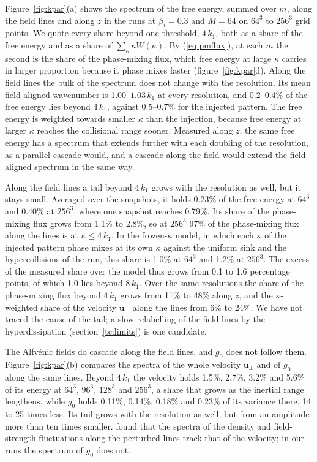 Figure~\ref{fig:kpar}(a) shows the spectrum of the free energy, summed over $m$, along the field lines and along $z$ in the runs at $\beta_i=0.3$ and $M=64$ on $64^3$ to $256^3$ grid points. We quote every share beyond one threshold, $4\,k_1$, both as a share of the free energy and as a share of $\sum_\kappa\kappa W(\kappa)$. By (\ref{eq:pmflux}), at each $m$ the second is the share of the phase-mixing flux, which free energy at large $\kappa$ carries in larger proportion because it phase mixes faster (figure~\ref{fig:kpar}d). Along the field lines the bulk of the spectrum does not change with the resolution. Its mean field-aligned wavenumber is 1.00--$1.03\,k_1$ at every resolution, and 0.2--0.4\% of the free energy lies beyond $4\,k_1$, against 0.5--0.7\% for the injected pattern. The free energy is weighted towards smaller $\kappa$ than the injection, because free energy at larger $\kappa$ reaches the collisional range sooner. Measured along $z$, the same free energy has a spectrum that extends further with each doubling of the resolution, as a parallel cascade would, and a cascade along the field would extend the field-aligned spectrum in the same way.

Along the field lines a tail beyond $4\,k_1$ grows with the resolution as well, but it stays small. Averaged over the snapshots, it holds 0.23\% of the free energy at $64^3$ and 0.40\% at $256^3$, where one snapshot reaches 0.79\%. Its share of the phase-mixing flux grows from 1.1\% to 2.8\%, so at $256^3$ 97\% of the phase-mixing flux along the lines is at $\kappa\le4\,k_1$. In the frozen-$\kappa$ model, in which each $\kappa$ of the injected pattern phase mixes at its own $\kappa$ against the uniform sink and the hypercollisions of the run, this share is 1.0\% at $64^3$ and 1.2\% at $256^3$. The excess of the measured share over the model thus grows from 0.1 to 1.6 percentage points, of which 1.0 lies beyond $8\,k_1$. Over the same resolutions the share of the phase-mixing flux beyond $4\,k_1$ grows from 11\% to 48\% along $z$, and the $\kappa$-weighted share of the velocity $\boldsymbol u_\perp$ along the lines from 6\% to 24\%. We have not traced the cause of the tail; a slow relabelling of the field lines by the hyperdissipation (section~\ref{tc:limits}) is one candidate.

The Alfv\'enic fields do cascade along the field lines, and $g_0$ does not follow them. Figure~\ref{fig:kpar}(b) compares the spectra of the whole velocity $\boldsymbol u_\perp$ and of $g_0$ along the same lines. Beyond $4\,k_1$ the velocity holds 1.5\%, 2.7\%, 3.2\% and 5.6\% of its energy at $64^3$, $96^3$, $128^3$ and $256^3$, a share that grows as the inertial range lengthens, while $g_0$ holds 0.11\%, 0.14\%, 0.18\% and 0.23\% of its variance there, 14 to 25 times less. Its tail grows with the resolution as well, but from an amplitude more than ten times smaller. \citet{Meyrand2019} found that the spectra of the density and field-strength fluctuations along the perturbed lines track that of the velocity; in our runs the spectrum of $g_0$ does not.

